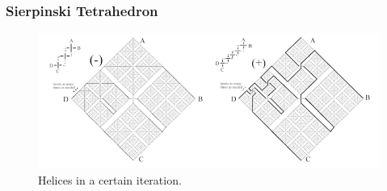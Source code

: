 \begin{frame}
	\frametitle{Sierpinski Tetrahedron}
	\begin{figure}[h]
		\centering
		\includegraphics[width=1.0\linewidth]{images/Helix1}
		\caption{Helices in a certain iteration. \cite{broden2024knotsinsidefractals}}\label{Fig:Helix1}
	\end{figure}
\end{frame}

